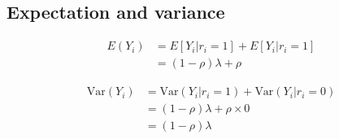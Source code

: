 \documentclass{amsart}
\def\Var{\text{Var}}
\begin{document}
\subsection{Expectation and variance}

\begin{equation*}
\begin{array}{ll}
E(Y_i) &= E[Y_i | r_i = 1] + E[Y_i | r_i = 1] \\
&= (1 - \rho) \lambda + \rho
\end{array}
\end{equation*}

\begin{equation*}
\begin{array}{ll}
\Var (Y_i) &= \Var (Y_i | r_i = 1) + \Var (Y_i | r_i = 0) \\
&= (1 - \rho) \lambda + \rho \times 0 \\
&= (1 - \rho) \lambda
\end{array}
\end{equation*}
\end{document}
